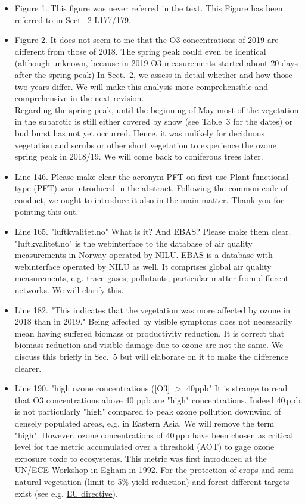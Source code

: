 \documentclass{scrartcl}
\begin{document}
\begin{itemize}
\item {\color{blue}Figure 1. This figure was never referred in the text.}
This Figure has been referred to in Sect.~2 L177/179.

\item {\color{blue}Figure 2. It does not seem to me that the O3 concentrations of 2019 are different from those of 2018. The spring peak could even be identical (although unknown, because in 2019 O3 measurements started about 20 days after the spring peak)}
In Sect.~2, we assess in detail whether and how those two years differ. We will make this analysis more comprehensible and comprehensive in the next revision.\\
Regarding the spring peak, until the beginning of May most of the vegetation in the subarctic is still either covered by snow (see Table~3 for the dates) or bud burst has not yet occurred. Hence, it was unlikely for deciduous vegetation and scrubs or other short vegetation to experience the ozone spring peak in 2018/19. We will come back to coniferous trees later. 

\item {\color{blue}Line 146. Please make clear the acronym PFT on first use}
Plant functional type (PFT) was introduced in the abstract. Following the common code of conduct, we ought to introduce it also in the main matter. Thank you for pointing this out.

\item {\color{blue}Line 165. "luftkvalitet.no" What is it? And EBAS? Please make them clear.}
"luftkvalitet.no" is the webinterface to the database of air quality measurements in Norway operated by NILU. EBAS is a database with webinterface operated by NILU as well. It comprises global air quality measurements, e.g. trace gases, pollutants, particular matter from different networks. We will clarify this.

\item {\color{blue}Line 182. "This indicates that the vegetation was more affected by ozone in 2018 than in 2019." Being affected by visible symptoms does not necessarily mean having suffered biomass or productivity reduction.} It is correct that biomass reduction and visible damage due to ozone are not the same. We discuss this briefly in Sec.~5 but will elaborate on it to make the difference clearer. 

\item {\color{blue}Line 190. "high ozone concentrations ([O3] $>$ 40ppb" It is strange to read that O3 concentrations above 40 ppb are "high" concentrations.}
Indeed 40\,ppb is not particularly "high" compared to peak ozone pollution downwind of densely populated areas, e.g. in Eastern Asia. We will remove the term "high". However, ozone concentrations of $40\,\mathrm{ppb}$ have been chosen as critical level for the metric accumulated over a threshold (AOT) to gage ozone exposure toxic to ecosystems. This metric was first introduced at the UN/ECE-Workshop in Egham in 1992. For the protection of crops and semi-natural vegetation (limit to 5\% yield reduction) and forest different targets exist (see e.g. \href{https://www.eea.europa.eu/publications/TOP08-98/page008.html}{EU directive}).


\end{itemize}
\end{document}
